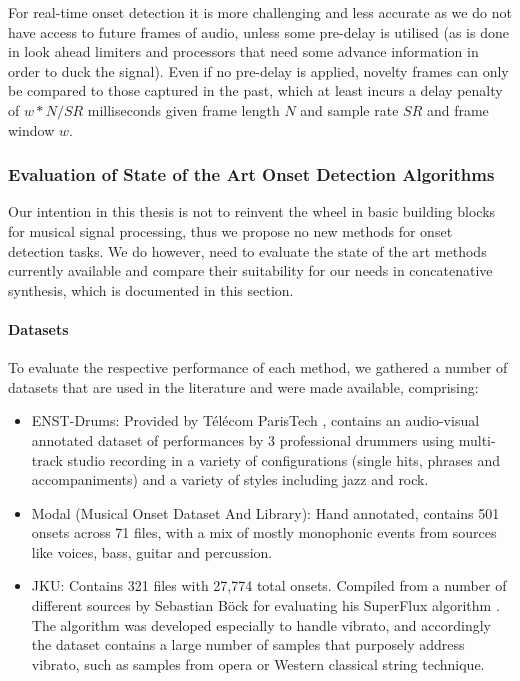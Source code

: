 For real-time onset detection it is more challenging and less accurate as we do not have access to future frames of audio, unless some pre-delay is utilised (as is done in look ahead limiters and processors that need some advance information in order to duck the signal). Even if no pre-delay is applied, novelty frames can only be compared to those captured in the past, which at least incurs a delay penalty of $w*N/SR$ milliseconds given frame length $N$ and sample rate $SR$ and frame window $w$.

\subsubsection{Evaluation of State of the Art Onset Detection Algorithms}

Our intention in this thesis is not to reinvent the wheel in basic building blocks for  musical signal processing, thus we propose no new methods for onset detection tasks. We do however, need to evaluate the state of the art methods currently available and compare their suitability for our needs in concatenative synthesis, which is documented in this section.

\paragraph{Datasets}

To evaluate the respective performance of each method, we gathered a number of datasets that are used in the literature and were made available, comprising:

\begin{itemize}
  \item ENST-Drums: Provided by Télécom ParisTech \citep{Gillet2006}, contains an audio-visual annotated dataset of performances by 3 professional drummers using multi-track studio recording in a variety of configurations (single hits, phrases and accompaniments) and a variety of styles including jazz and rock. 
  \item Modal (Musical Onset Dataset And Library): Hand annotated, contains 501 onsets across 71 files, with a mix of mostly monophonic events from sources like voices, bass, guitar and percussion. \citep{Glover2011}
  \item JKU: Contains 321 files with 27,774 total onsets. Compiled from a number of different sources by Sebastian Böck for evaluating his SuperFlux algorithm \citep{Bock2013}. The algorithm was developed especially to handle vibrato, and accordingly the dataset contains a large number of samples that purposely address vibrato, such as samples from opera or Western classical string technique.
\end{itemize}

